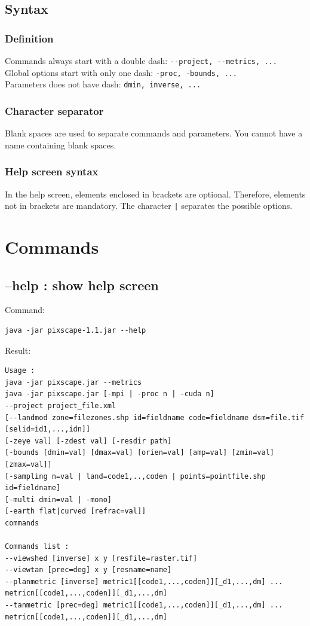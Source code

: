 \documentclass{report}
\begin{document}
\subsection{Syntax}
\subsubsection{Definition}
Commands always start with a double dash: \verb|--project, --metrics, ...|\\
Global options start with only one dash: \verb|-proc, -bounds, ...|\\
Parameters does not have dash: \verb|dmin, inverse, ...|

\subsubsection{Character separator}
Blank spaces are used to separate commands and parameters.  You cannot have a name containing blank spaces.

\subsubsection{Help screen syntax}
In the help screen, elements enclosed in brackets are optional. Therefore, elements not in brackets are mandatory. The character \verb+|+ separates the possible options.

\section{Commands}

\subsection{--help : show help screen}
Command:
\begin{Verbatim}
java -jar pixscape-1.1.jar --help
\end{Verbatim}
Result:
\begin{Verbatim}
Usage :
java -jar pixscape.jar --metrics
java -jar pixscape.jar [-mpi | -proc n | -cuda n]
--project project_file.xml
[--landmod zone=filezones.shp id=fieldname code=fieldname dsm=file.tif [selid=id1,...,idn]]
[-zeye val] [-zdest val] [-resdir path]
[-bounds [dmin=val] [dmax=val] [orien=val] [amp=val] [zmin=val] [zmax=val]]
[-sampling n=val | land=code1,..,coden | points=pointfile.shp id=fieldname]
[-multi dmin=val | -mono]
[-earth flat|curved [refrac=val]]
commands

Commands list :
--viewshed [inverse] x y [resfile=raster.tif]
--viewtan [prec=deg] x y [resname=name]
--planmetric [inverse] metric1[[code1,...,coden]][_d1,...,dm] ... metricn[[code1,...,coden]][_d1,...,dm]
--tanmetric [prec=deg] metric1[[code1,...,coden]][_d1,...,dm] ... metricn[[code1,...,coden]][_d1,...,dm]
\end{Verbatim}
\end{document}
